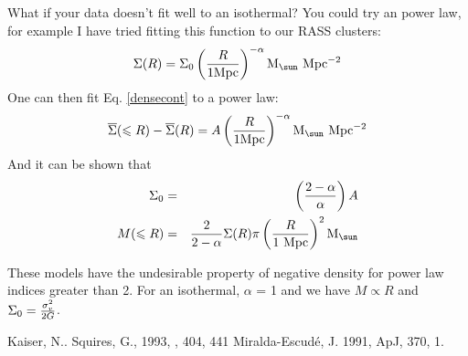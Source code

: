 \documentclass[preprint]{aastex}
\begin{document}
What if your data doesn't fit well to an isothermal?  You could try an power
law, for example I have tried fitting this function to our RASS clusters:
\begin{equation}
\Sigma(R) = \Sigma_0 \left( R \over {1 \textrm{Mpc} } \right)^{-\alpha}
\textrm{M$_{\sun}$ Mpc$^{-2}$}
\end{equation}
One can then fit Eq. \ref{densecont} to a power law:
\begin{equation}
\overline{\Sigma}(\leqslant R) - \overline{\Sigma}(R) = 
A \left( R \over {1 \textrm{Mpc} } \right)^{-\alpha} \textrm{M$_{\sun}$ Mpc$^{-2}$}
\end{equation}
And it can be shown that
\begin{eqnarray}
\Sigma_0 & = & \left( {2-\alpha} \over \alpha \right) A \\
M(\leqslant R) & = & {2 \over {2-\alpha}} \Sigma(R) 
\pi \left(R \over \textrm{1 Mpc} \right)^2 \textrm{M$_{\sun}$}
\end{eqnarray}

These models have the undesirable property of negative density for power law
indices greater than 2. For an isothermal, $\alpha$ = 1 and we
have $M \propto R$ and $\Sigma_0 = {\sigma_v^2 \over {2 G}}$.

\begin{thebibliography}{}

 Kaiser, N.. Squires, G., 1993, \apj,
404, 441
 Miralda-Escud\'{e}, J. 1991, 
ApJ, 370, 1.

\end{thebibliography}{}
\end{document}
